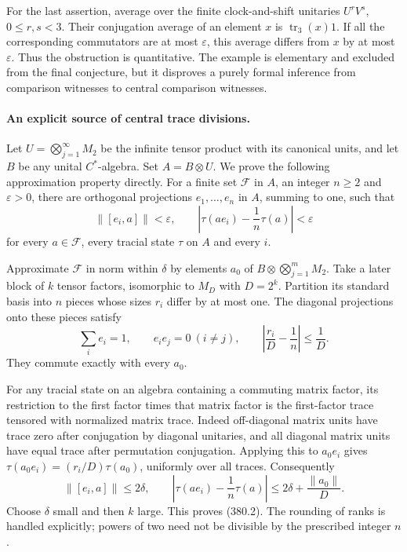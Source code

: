 \documentclass[11pt]{article}
\begin{document}
For the last assertion, average over the finite clock-and-shift
unitaries $U^rV^s$, $0\leq r,s<3$. Their conjugation average of
an element $x$ is $\operatorname{tr}_3(x)1$. If all the corresponding
commutators are at most $\varepsilon$, this average differs from
$x$ by at most $\varepsilon$. Thus the obstruction is quantitative.
The example is elementary and excluded from the final conjecture,
but it disproves a purely formal inference from comparison
witnesses to central comparison witnesses.

\paragraph{An explicit source of central trace divisions.}
Let $U=\bigotimes_{j=1}^\infty M_2$ be the infinite tensor
product with its canonical units, and let $B$ be any unital
$C^*$-algebra. Set $A=B\otimes U$. We prove the following
approximation property directly. For a finite set $\mathcal F$
in $A$, an integer $n\geq2$ and $\varepsilon>0$, there are
orthogonal projections $e_1,\ldots,e_n$ in $A$, summing to one,
such that
\[
 \|[e_i,a]\|<\varepsilon,
 \qquad
 \left|\tau(ae_i)-\frac1n\tau(a)\right|<\varepsilon
 \tag{380.2}
\]
for every $a\in\mathcal F$, every tracial state $\tau$ on $A$
and every $i$.

Approximate $\mathcal F$ in norm within $\delta$ by elements
$a_0$ of $B\otimes\bigotimes_{j=1}^mM_2$. Take a later block
of $k$ tensor factors, isomorphic to $M_D$ with $D=2^k$.
Partition its standard basis into $n$ pieces whose sizes $r_i$
differ by at most one. The diagonal projections onto these pieces
satisfy
\[
 \sum_ie_i=1,\qquad e_ie_j=0\ (i\ne j),\qquad
 \left|\frac{r_i}D-\frac1n\right|\leq\frac1D.
\]
They commute exactly with every $a_0$.

For any tracial state on an algebra containing a commuting matrix
factor, its restriction to the first factor times that matrix
factor is the first-factor trace tensored with normalized matrix
trace. Indeed off-diagonal matrix units have trace zero after
conjugation by diagonal unitaries, and all diagonal matrix units
have equal trace after permutation conjugation. Applying this
to $a_0e_i$ gives
$\tau(a_0e_i)=(r_i/D)\tau(a_0)$, uniformly over all traces.
Consequently
\[
 \|[e_i,a]\|\leq2\delta,\qquad
 \left|\tau(ae_i)-\frac1n\tau(a)\right|
      \leq2\delta+\frac{\|a_0\|}{D}.
 \tag{380.3}
\]
Choose $\delta$ small and then $k$ large. This proves (380.2).
The rounding of ranks is handled explicitly; powers of two
need not be divisible by the prescribed integer $n$.
\end{document}
